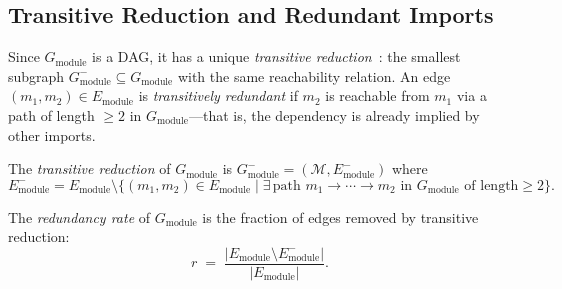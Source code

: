 \subsection{Transitive Reduction and Redundant Imports}
\label{sec:transitive-reduction}

Since $G_{\mathrm{module}}$ is a DAG, it has a unique \emph{transitive reduction}~\cite{ahu1972}: the smallest subgraph $G_{\mathrm{module}}^{-} \subseteq G_{\mathrm{module}}$ with the same reachability relation. An edge $(m_1, m_2) \in E_{\mathrm{module}}$ is \emph{transitively redundant} if $m_2$ is reachable from $m_1$ via a path of length $\ge 2$ in $G_{\mathrm{module}}$---that is, the dependency is already implied by other imports.

\begin{definition}
The \emph{transitive reduction} of $G_{\mathrm{module}}$ is $G_{\mathrm{module}}^{-} = (\mathcal{M}, E_{\mathrm{module}}^{-})$ where
\[
  E_{\mathrm{module}}^{-} = E_{\mathrm{module}} \setminus \{(m_1, m_2)\in E_{\mathrm{module}} \mid \exists\, \text{path } m_1 \to \cdots \to m_2 \text{ in } G_{\mathrm{module}} \text{ of length} \ge 2\}.
\]
\end{definition}

\begin{definition}
\label{def:redundancy-rate}
The \emph{redundancy rate} of $G_{\mathrm{module}}$ is the fraction of edges removed by transitive reduction:
\[
  r \;=\; \frac{|E_{\mathrm{module}} \setminus E_{\mathrm{module}}^{-}|}{|E_{\mathrm{module}}|}.
\]
\end{definition}

